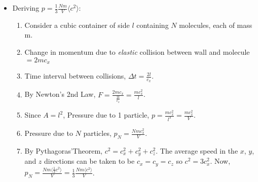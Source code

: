 \documentclass[oneside]{book}
\begin{document}
\begin{itemize}
\begin{tabular}{|Sc|Sl|}
\begin{tabular}{@{}Sl@{}}
        \end{tabular}\\
        \hline
        \textbf{V} & 
        \begin{tabular}{@{}Sl@{}}
        The volume of the gas molecules themselves is negligible \\compared to the volume of the container.
        \end{tabular}\\
        \hline
    \end{tabular}
    \item Deriving \(p=\frac{1}{3}\frac{Nm}{V}\langle c^2 \rangle\):
    \begin{enumerate}
        \item Consider a cubic container of side \(l\) containing \(N\) molecules, each of mass m.
        \item Change in momentum due to \emph{elastic} collision between wall and molecule\(\text{}=2mc_x\)
        \item Time interval between collisions, \(\Delta t=\frac{2l}{c_x}\).
        \item By Newton's 2nd Law, \(F=\frac{2mc_x}{\frac{2l}{c_x}}=\frac{mc_x^2}{l}\).
        \item Since \(A=l^2\), Pressure due to 1 particle, \(p=\frac{mc_x^2}{l^3}=\frac{mc_x^2}{V}\).
        \item Pressure due to \(N\) particles, \(p_N=\frac{Nmc_x^2}{V}\).
        \item By Pythagoras'Theorem, \(c^2=c_x^2+c_y^2+c_z^2\). The average speed in the \(x\), \(y\), and \(z\) directions can be taken to be \(c_x=c_y=c_z\) so \(c^2=3c_x^2\). Now, \(p_N=\frac{Nm\langle \frac{1}{3}c^2\rangle}{V}=\frac{1}{3}\frac{Nm\langle c^2 \rangle}{V}\).
    \end{enumerate}
\end{itemize}
\end{document}
